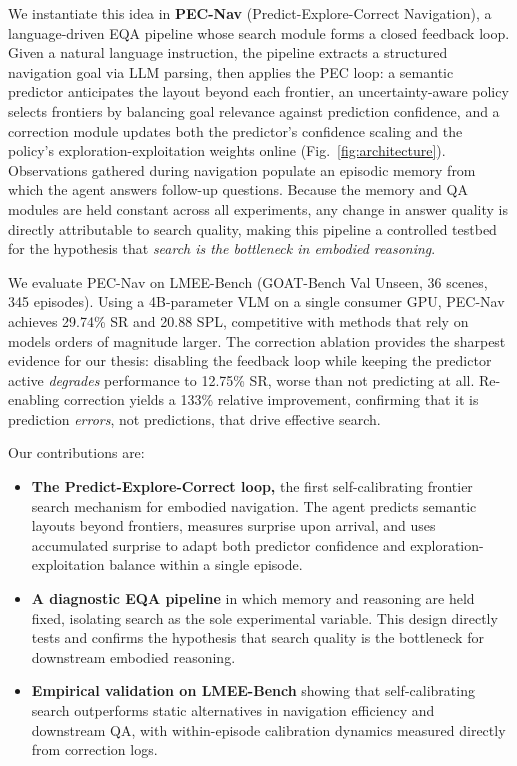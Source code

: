 \documentclass[10pt,twocolumn,letterpaper]{article}
\begin{document}
We instantiate this idea in \textbf{PEC-Nav} (Predict-Explore-Correct Navigation), a language-driven EQA pipeline whose search module forms a closed feedback loop. Given a natural language instruction, the pipeline extracts a structured navigation goal via LLM parsing, then applies the PEC loop: a semantic predictor anticipates the layout beyond each frontier, an uncertainty-aware policy selects frontiers by balancing goal relevance against prediction confidence, and a correction module updates both the predictor's confidence scaling and the policy's exploration-exploitation weights online (Fig.~\ref{fig:architecture}). Observations gathered during navigation populate an episodic memory from which the agent answers follow-up questions. Because the memory and QA modules are held constant across all experiments, any change in answer quality is directly attributable to search quality, making this pipeline a controlled testbed for the hypothesis that \emph{search is the bottleneck in embodied reasoning}.

We evaluate PEC-Nav on LMEE-Bench (GOAT-Bench Val Unseen, 36 scenes, 345 episodes). Using a 4B-parameter VLM on a single consumer GPU, PEC-Nav achieves 29.74\% SR and 20.88 SPL, competitive with methods that rely on models orders of magnitude larger. The correction ablation provides the sharpest evidence for our thesis: disabling the feedback loop while keeping the predictor active \emph{degrades} performance to 12.75\% SR, worse than not predicting at all. Re-enabling correction yields a 133\% relative improvement, confirming that it is prediction \emph{errors}, not predictions, that drive effective search.

Our contributions are:
\begin{itemize}
    \item \textbf{The Predict-Explore-Correct loop,} the first self-calibrating frontier search mechanism for embodied navigation. The agent predicts semantic layouts beyond frontiers, measures surprise upon arrival, and uses accumulated surprise to adapt both predictor confidence and exploration-exploitation balance within a single episode.
    \item \textbf{A diagnostic EQA pipeline} in which memory and reasoning are held fixed, isolating search as the sole experimental variable. This design directly tests and confirms the hypothesis that search quality is the bottleneck for downstream embodied reasoning.
    \item \textbf{Empirical validation on LMEE-Bench} showing that self-calibrating search outperforms static alternatives in navigation efficiency and downstream QA, with within-episode calibration dynamics measured directly from correction logs.
\end{itemize}
\end{document}
